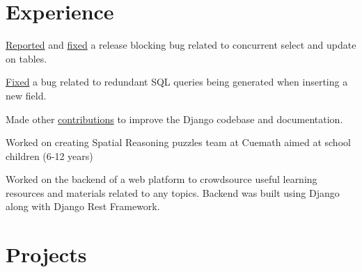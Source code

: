 \documentclass[]{abhijeet_viswa-deedy-resume-openfont}
\begin{document}
\begin{minipage}[t]{0.70\textwidth}


\section{Experience}
\sectionsep
\begin{tightemize}
\item \href{https://code.djangoproject.com/ticket/31246}{Reported} and \href{https://github.com/django/django/pull/12434}{fixed}
a release blocking bug related to concurrent select and update on tables.
\item \href{https://github.com/django/django/pull/12496}{Fixed} a bug related to redundant SQL queries being generated when
inserting a new field.
\item Made other \href{https://github.com/django/django/pulls?q=abhijeetviswa}{contributions} to improve the Django codebase and documentation.
\end{tightemize}
\subsectionsep


\begin{tightemize}
\item Worked on creating Spatial Reasoning puzzles team at Cuemath aimed at
school children (6-12 years)

\item Worked on the backend of a web platform to crowdsource useful learning resources and materials related to any topics.
Backend was built using Django along with Django Rest Framework.
\end{tightemize}
\sectionsep  %


\sectionsep
\sectionsep  %
\section{Projects}
\vspace{\itemsep}
\RaggedRight
\sectionsep


\end{minipage}
\end{document}
